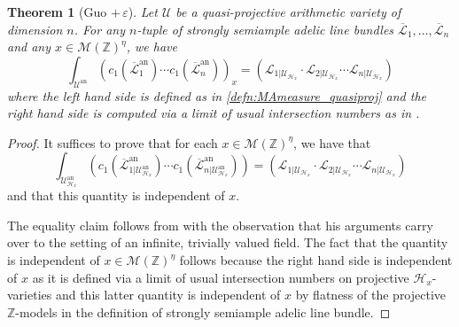 \documentclass[11pt,reqno]{amsart}
\newcommand{\mZ}{\mathbb{Z}}
\newcommand{\cU}{\mathcal{U}}
\newcommand{\cL}{\mathcal{L}}
\newcommand{\pwr}[1]{ \left( #1 \right) }
\newcommand{\sH}{{\mathscr H}}
\newcommand{\sM}{{\mathscr M}}
\theoremstyle{theorem}
\numberwithin{equation}{subsection}
\newtheorem{theorem}[subsubsection]{Theorem}
\numberwithin{equation}{subsection}
\theoremstyle{definition}
\theoremstyle{remark}
\numberwithin{equation}{subsubsection} \numberwithin{figure}{section}
\DeclareMathOperator{\an}{an}
\begin{document}
\begin{theorem}[Guo $+\, \varepsilon$]\label{thm:intersection_Guo_epsilon}
Let $\cU$ be a quasi-projective arithmetic variety of dimension $n$. 
For any $n$-tuple of strongly semiample adelic line bundles $\overline{\cL}_1,\dots,\overline{\cL}_n$ and any $x\in \sM(\mZ)^{\eta}$, we have
\begin{equation}\label{eqn:totalmass}
\int_{\cU^{\an}} (c_1(\overline{\cL}_1^{\an})\cdots c_1(\overline{\cL}_n^{\an}))_x = \pwr{ \cL_{1|\cU_{\sH_x}} \cdot \cL_{2|\cU_{\sH_x}} \cdots \cL_{n|\cU_{\sH_x}}}
\end{equation}
where the left hand side is defined as in \autoref{defn:MAmeasure_quasiproj} and the right hand side is computed via a limit of usual intersection numbers as  in \cite[Proposition 4.1.1]{YuanZhang:AdelicLineBundles}.   
\end{theorem}

\begin{proof}
It suffices to prove that for each $x\in \sM(\mZ)^{\eta}$, we have that 
\[
\int_{\cU^{\an}_{\sH_x}}  (c_1(\overline{\cL}^{\an}_{1|\cU_{\sH_x}^{\an}})\cdots c_1(\overline{\cL}^{\an}_{n|\cU_{\sH_x}^{\an}})) = \pwr{ \cL_{1|\cU_{\sH_x}} \cdot \cL_{2|\cU_{\sH_x}} \cdots \cL_{n|\cU_{\sH_x}}}
\]
and that this quantity is independent of $x$. 


The equality claim follows from \cite[Theorem 1.2]{Guo:Integration} with the observation that his arguments carry over to the setting of an infinite, trivially valued field.  
The fact that the quantity is independent of $x\in \sM(\mZ)^{\eta}$ follows because the right hand side is independent of $x$ as it is defined via a limit of usual intersection numbers on projective $\sH_x$-varieties and this latter quantity is independent of $x$ by flatness of the projective $\mZ$-models in the definition of strongly semiample adelic line bundle. 
\end{proof}
\end{document}
